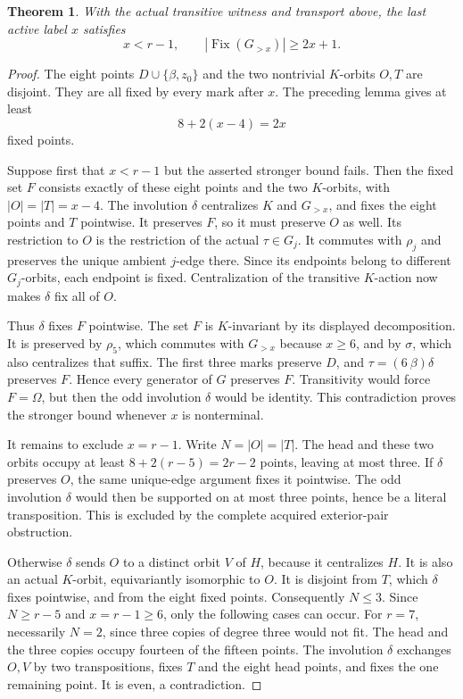 \documentclass[11pt,a4paper]{article}
\newtheorem{theorem}[lemma]{Theorem}
\begin{document}
\begin{theorem}
With the actual transitive witness and transport above,
the last active label $x$ satisfies
\[
 x<r-1,\qquad |\operatorname{Fix}(G_{>x})|\ge2x+1.
\]
\end{theorem}
\begin{proof}
The eight points $D\cup\{\beta,z_0\}$ and the two
nontrivial $K$-orbits $O,T$ are disjoint. They are
all fixed by every mark after $x$. The preceding
lemma gives at least
\[
                         8+2(x-4)=2x              \tag{1}
\]
fixed points.

Suppose first that $x<r-1$ but the asserted stronger
bound fails. Then the fixed set $F$ consists exactly
of these eight points and the two $K$-orbits, with
$|O|=|T|=x-4$. The involution $\delta$ centralizes
$K$ and $G_{>x}$, and fixes the eight points and
$T$ pointwise. It preserves $F$, so it must preserve
$O$ as well. Its restriction to $O$ is the
restriction of the actual $\tau\in G_j$. It
commutes with $\rho_j$ and preserves the unique
ambient $j$-edge there. Since its endpoints belong
to different $G_j$-orbits, each endpoint is fixed.
Centralization of the transitive $K$-action now
makes $\delta$ fix all of $O$.

Thus $\delta$ fixes $F$ pointwise. The set $F$
is $K$-invariant by its displayed decomposition.
It is preserved by $\rho_5$, which commutes with
$G_{>x}$ because $x\ge6$, and by $\sigma$, which
also centralizes that suffix. The first three
marks preserve $D$, and $\tau=(6\ \beta)\delta$
preserves $F$. Hence every generator of $G$
preserves $F$. Transitivity would force $F=\Omega$,
but then the odd involution $\delta$ would be
identity. This contradiction proves the stronger
bound whenever $x$ is nonterminal.

It remains to exclude $x=r-1$. Write $N=|O|=|T|$.
The head and these two orbits occupy at least
$8+2(r-5)=2r-2$ points, leaving at most three.
If $\delta$ preserves $O$, the same unique-edge
argument fixes it pointwise. The odd involution
$\delta$ would then be supported on at most three
points, hence be a literal transposition. This is
excluded by the complete acquired exterior-pair
obstruction.

Otherwise $\delta$ sends $O$ to a distinct orbit
$V$ of $H$, because it centralizes $H$. It is
also an actual $K$-orbit, equivariantly isomorphic
to $O$. It is disjoint from $T$, which $\delta$
fixes pointwise, and from the eight fixed points.
Consequently $N\le3$. Since $N\ge r-5$ and
$x=r-1\ge6$, only the following cases can occur.
For $r=7$, necessarily $N=2$, since three copies
of degree three would not fit. The head and the
three copies occupy fourteen of the fifteen points.
The involution $\delta$ exchanges $O,V$ by two
transpositions, fixes $T$ and the eight head points,
and fixes the one remaining point. It is even,
a contradiction.


\end{proof}
\end{document}
